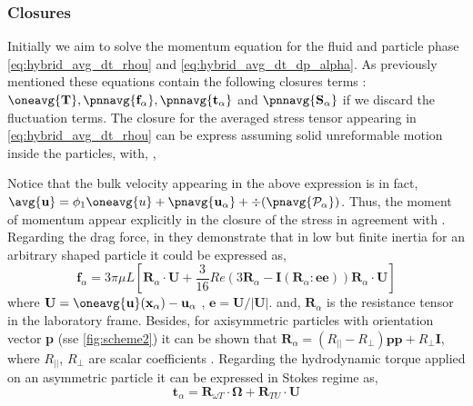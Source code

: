 \subsubsection*{Closures}
Initially we aim to solve the momentum equation for the fluid and particle phase \ref{eq:hybrid_avg_dt_rhou} and \ref{eq:hybrid_avg_dt_dp_alpha}. 
As previously mentioned these equations contain the following closures terms : $\oneavg{\textbf{T}}, \pnnavg{\textbf{f}_\alpha}, \pnnavg{\textbf{t}_\alpha}$ and $\pnnavg{\textbf{S}_\alpha}$ if we discard the fluctuation terms.
The closure for the averaged stress tensor appearing in \ref{eq:hybrid_avg_dt_rhou} can be express assuming solid unreformable motion inside the particles, with, \citep{jackson1997locally},



Notice that the bulk velocity appearing in the above expression is in fact, $\avg{\textbf{u}} = \phi_1\oneavg{u} + \pnavg{\textbf{u}_\alpha} + \div (\pnavg{\mathcal{P}_\alpha})$.
Thus, the moment of momentum appear explicitly in the closure of the stress in agreement with \citet{zhang1997momentum}.  
Regarding the drag force, in  \citet{brenner1963resistance} they demonstrate that in low but finite inertia for an arbitrary shaped particle it could be expressed as,
\begin{equation}
    \textbf{f}_\alpha = 3 \pi \mu L \left[
        \textbf{R}_\alpha \cdot \textbf{U}
        + \frac{3}{16} Re  \left(
            3 \textbf{R}_\alpha 
            - \textbf{I} (\textbf{R}_\alpha : \textbf{e} \textbf{e})
        \right)
        \textbf{R}_\alpha\cdot  \textbf{U}
    \right]
\end{equation}
where $\textbf{U} = \oneavg{\textbf{u}}(\textbf{x}_\alpha)  - \textbf{u}_\alpha$ , $\textbf{e} = \textbf{U}/|\textbf{U}|$. 
and,  $\textbf{R}_\alpha$ is the resistance tensor in the laboratory frame. 
Besides, for axisymmetric particles with orientation vector \textbf{p} (sse \ref{fig:scheme2}) it can be shown that $\textbf{R}_\alpha = (R_{||} - R_\bot) \textbf{pp} + R_\bot \textbf{I}$, where $R_{||}$, $R_\bot$ are scalar coefficients \citep{guazzelli2011,kim2013microhydrodynamics}. 
Regarding the hydrodynamic torque applied on an asymmetric particle it can be expressed in Stokes regime as, 
\begin{equation}
    \textbf{t}_\alpha 
    = 
    \textbf{R}_{\omega T}\cdot \mathbf{\Omega}
     + \textbf{R}_{TU} \cdot \textbf{U} 
\end{equation}
